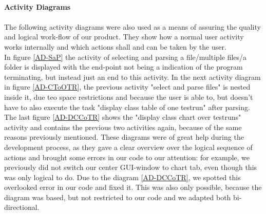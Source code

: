 \newpage

\ \\
\textbf{Activity Diagrams}\\
\ \\
The following activity diagrams were also used as a means of assuring the quality and logical work-flow of our product. They show how a normal user activity works internally and which actions shall and can be taken by the user.\\ 
In figure \ref{AD-SaP} the activity of selecting and parsing a file/multiple files/a folder is displayed with the end-point not being a indication of the program terminating, but instead just an end to this activity. In the next activity diagram in figure \ref{AD-CToOTR}, the previous activity "select and parse files" is nested inside it, due teo space restrictions and because the user is able to, but doesn't have to also execute the task "display class table of one testrun" after parsing. The last figure \ref{AD-DCCoTR} shows the "display class chart over testruns" activity and contains the previous two activities again, because of the same reasons previously mentioned. These diagrams were of great help during the development process, as they gave a clear overview over the logical sequence of actions and brought some errors in our code to our attention: for example, we previously did not switch our center GUI-window to chart tab, even though this was only logical to do. Due to the diagram \ref{AD-DCCoTR}, we spotted this overlooked error in our code and fixed it. This was also only possible, because the diagram was based, but not restricted to our code and we adapted both bi-directional.\\
\ \\
